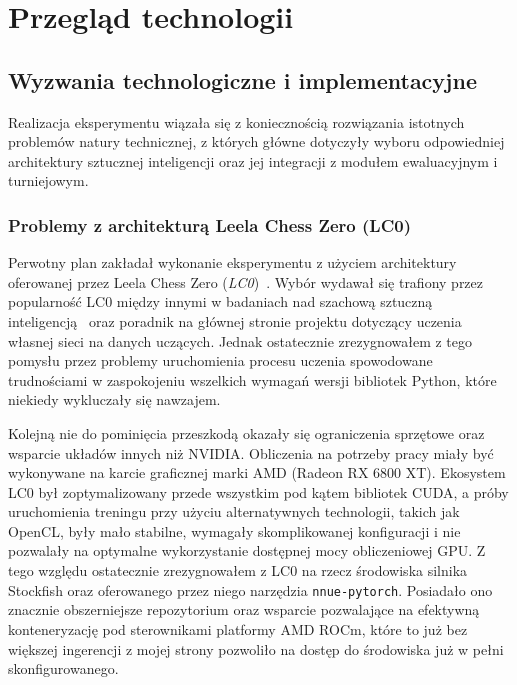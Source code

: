 \documentclass[12pt,a4paper]{report}
\begin{document}
\chapter{Przegląd technologii}

\section{Wyzwania technologiczne i implementacyjne}

Realizacja eksperymentu wiązała się z koniecznością rozwiązania istotnych problemów natury technicznej, z których główne dotyczyły wyboru odpowiedniej architektury sztucznej inteligencji oraz jej integracji z modułem ewaluacyjnym i turniejowym.

\subsection{Problemy z architekturą Leela Chess Zero (LC0)}

Perwotny plan zakładał wykonanie eksperymentu z użyciem architektury oferowanej przez Leela Chess Zero (\textit{LC0})~\cite{lc0}. Wybór wydawał się trafiony przez popularność LC0 między innymi w badaniach nad szachową sztuczną inteligencją~\cite{silver2018general} oraz poradnik na głównej stronie projektu dotyczący uczenia własnej sieci na danych uczących. Jednak ostatecznie zrezygnowałem z tego pomysłu przez problemy uruchomienia procesu uczenia spowodowane trudnościami w zaspokojeniu wszelkich wymagań wersji bibliotek Python, które niekiedy wykluczały się nawzajem.

Kolejną nie do pominięcia przeszkodą okazały się ograniczenia sprzętowe oraz wsparcie układów innych niż NVIDIA. Obliczenia na potrzeby pracy miały być wykonywane na karcie graficznej marki AMD (Radeon RX 6800 XT). Ekosystem LC0 był zoptymalizowany przede wszystkim pod kątem bibliotek CUDA, a próby uruchomienia treningu przy użyciu alternatywnych technologii, takich jak OpenCL, były mało stabilne, wymagały skomplikowanej konfiguracji i nie pozwalały na optymalne wykorzystanie dostępnej mocy obliczeniowej GPU. Z tego względu ostatecznie zrezygnowałem z LC0 na rzecz środowiska silnika Stockfish oraz oferowanego przez niego narzędzia \texttt{nnue-pytorch}. Posiadało ono znacznie obszerniejsze repozytorium oraz wsparcie pozwalające na efektywną konteneryzację pod sterownikami platformy AMD ROCm, które to już bez większej ingerencji z mojej strony pozwoliło na dostęp do środowiska już w pełni skonfigurowanego.
\end{document}
